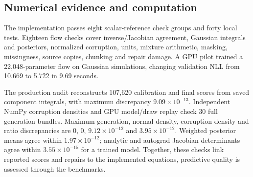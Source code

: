 \documentclass{llncs}
\newcommand{\1}{\mathbf{1}}
\newcommand{\AuditCandidates}{107,620}
\newcommand{\AuditMaximum}{$9.09\times10^{-13}$}
\newcommand{\PilotTime}{9.69}
\newcommand{\PilotInitial}{10.669}
\newcommand{\PilotFinal}{5.722}
\newcommand{\ReplayDensity}{0}
\newcommand{\ReplayGeneration}{0}
\newcommand{\ReplayCorruption}{$9.12\times10^{-12}$}
\newcommand{\ReplayRatio}{$3.95\times10^{-12}$}
\newcommand{\ReplayPosterior}{$1.97\times10^{-12}$}
\newcommand{\ReplayJacobian}{$3.55\times10^{-15}$}
\newcommand{\ReplayBundles}{30}
\begin{document}
\subsection{Numerical evidence and computation}
The implementation passes eight scalar-reference check groups and forty local tests. Eighteen flow checks cover inverse/Jacobian agreement, Gaussian integrals and posteriors, normalized corruption, units, mixture arithmetic, masking, missingness, source copies, chunking and repair damage. A GPU pilot trained a 22,048-parameter flow on Gaussian simulations, changing validation NLL from \PilotInitial{} to \PilotFinal{} in \PilotTime{} seconds.

The production audit reconstructs \AuditCandidates{} calibration and final scores from saved component integrals, with maximum discrepancy \AuditMaximum. Independent NumPy corruption densities and GPU model/draw replay check \ReplayBundles{} full generation bundles. Maximum generation, normal density, corruption density and ratio discrepancies are \ReplayGeneration, \ReplayDensity, \ReplayCorruption{} and \ReplayRatio. Weighted posterior means agree within \ReplayPosterior; analytic and autograd Jacobian determinants agree within \ReplayJacobian{} for a trained model. Together, these checks link reported scores and repairs to the implemented equations, predictive quality is assessed through the benchmarks.
\end{document}
